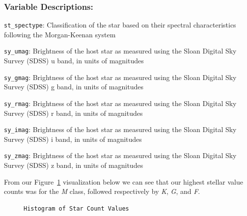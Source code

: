 \documentclass[
  letterpaper,
  DIV=11,
  numbers=noendperiod]{scrartcl}
\begin{document}
\subsubsection{Variable Descriptions:}\label{variable-descriptions}

\texttt{st\_spectype}: Classification of the star based on their
spectral characteristics following the Morgan-Keenan system

\texttt{sy\_umag}: Brightness of the host star as measured using the
Sloan Digital Sky Survey (SDSS) u band, in units of magnitudes

\texttt{sy\_gmag}: Brightness of the host star as measured using the
Sloan Digital Sky Survey (SDSS) g band, in units of magnitudes

\texttt{sy\_rmag}: Brightness of the host star as measured using the
Sloan Digital Sky Survey (SDSS) r band, in units of magnitudes

\texttt{sy\_imag}: Brightness of the host star as measured using the
Sloan Digital Sky Survey (SDSS) i band, in units of magnitudes

\texttt{sy\_zmag}: Brightness of the host star as measured using the
Sloan Digital Sky Survey (SDSS) z band, in units of magnitudes

From our Figure~\ref{fig-sy-umag} visualization below we can see that
our highest stellar value counts was for the \emph{M} class, followed
respectively by \emph{K}, \emph{G}, and \emph{F}.

\begin{figure}[H]


\caption{\label{fig-sy-umag}\texttt{Histogram\ of\ Star\ Count\ Values}}

\end{figure}%
\end{document}

